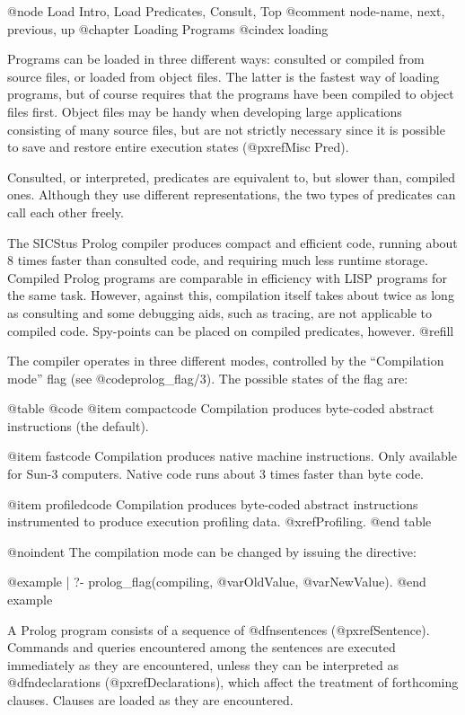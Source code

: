 @node Load Intro, Load Predicates, Consult, Top
@comment  node-name,  next,  previous,  up
@chapter Loading Programs
@cindex loading

Programs can be loaded in three different ways: consulted or compiled
from source files, or loaded from object files.  The latter is the
fastest way of loading programs, but of course requires that the
programs have been compiled to object files first.  Object files may be
handy when developing large applications consisting of many source
files, but are not strictly necessary since it is possible to save and
restore entire execution states (@pxref{Misc Pred}).

Consulted, or interpreted, predicates are equivalent to, but slower
than, compiled ones.  Although they use different representations, the
two types of predicates can call each other freely.

The SICStus Prolog compiler produces compact and efficient code, running
about 8 times faster than consulted code, and requiring much less
runtime storage.  Compiled Prolog programs are comparable in efficiency
with LISP programs for the same task.  However, against this,
compilation itself takes about twice as long as consulting and some
debugging aids, such as tracing, are not applicable to compiled code.
Spy-points can be placed on compiled predicates, however.  @refill

The compiler operates in three different modes, controlled by the
``Compilation mode'' flag (see @code{prolog_flag/3}).  The possible
states of the flag are:

@table @code
@item compactcode
Compilation produces byte-coded abstract instructions (the default).

@item fastcode
Compilation produces native machine instructions.  Only available for
Sun-3 computers.  Native code runs about 3 times faster than byte code.

@item profiledcode
Compilation produces byte-coded abstract instructions instrumented to
produce execution profiling data.  @xref{Profiling}.
@end table

@noindent
The compilation mode can be changed by issuing the directive:

@example
| ?- prolog_flag(compiling, @var{OldValue}, @var{NewValue}).
@end example

A Prolog program consists of a sequence of @dfn{sentences}
(@pxref{Sentence}).  Commands and queries encountered among the
sentences are executed immediately as they are encountered, unless they
can be interpreted as @dfn{declarations} (@pxref{Declarations}), which
affect the treatment of forthcoming clauses.  Clauses are loaded as they
are encountered.

